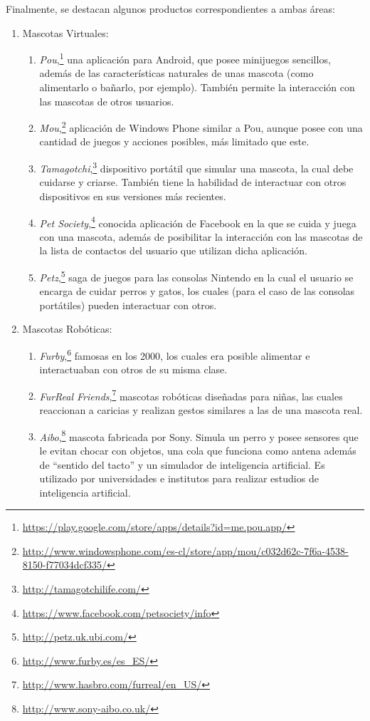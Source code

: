 Finalmente, se destacan algunos productos correspondientes a ambas \'areas:
\begin{enumerate}
\item Mascotas Virtuales:
  \begin{enumerate}
  \item \emph{Pou},\footnote{\url{https://play.google.com/store/apps/details?id=me.pou.app/}} una aplicaci\'on para Android, que posee minijuegos sencillos, adem\'as de las caracter\'isticas naturales de unas mascota (como alimentarlo o ba\~narlo, por ejemplo). Tambi\'en permite la interacci\'on con las mascotas de otros usuarios.
  \item \emph{Mou},\footnote{\url{http://www.windowsphone.com/es-cl/store/app/mou/c032d62c-7f6a-4538-8150-f77034dcf335/}} aplicaci\'on de Windows Phone similar a Pou, aunque posee con una cantidad de juegos y acciones posibles, m\'as limitado que este.
  \item \emph{Tamagotchi},\footnote{\url{http://tamagotchilife.com/}} dispositivo port\'atil que simular una mascota, la cual debe cuidarse y criarse. Tambi\'en tiene la habilidad de interactuar con otros dispositivos en sus versiones m\'as recientes.
  \item \emph{Pet Society},\footnote{\url{https://www.facebook.com/petsociety/info}} conocida aplicaci\'on de Facebook en la que se cuida y juega con una mascota, adem\'as de posibilitar la interacci\'on con las mascotas de la lista de contactos del usuario que utilizan dicha aplicaci\'on.
  \item \emph{Petz},\footnote{\url{http://petz.uk.ubi.com/}} saga de juegos para las consolas Nintendo en la cual el usuario se encarga de cuidar perros y gatos, los cuales (para el caso de las consolas port\'atiles) pueden interactuar con otros.
  \end{enumerate}
\item Mascotas Rob\'oticas:
  \begin{enumerate}
  \item \emph{Furby},\footnote{\url{http://www.furby.es/es_ES/}} famosas en los 2000, los cuales era posible alimentar e interactuaban con otros de su misma clase.
  \item \emph{FurReal Friends},\footnote{\url{http://www.hasbro.com/furreal/en_US/}} mascotas rob\'oticas dise\~nadas para ni\~nas, las cuales reaccionan a caricias y realizan gestos similares a las de una mascota real.
  \item \emph{Aibo},\footnote{\url{http://www.sony-aibo.co.uk/}} mascota fabricada por Sony. Simula un perro y posee sensores que le evitan chocar con objetos, una cola que funciona como antena adem\'as de “sentido del tacto” y un simulador de inteligencia artificial. Es utilizado por universidades e institutos para realizar estudios de inteligencia artificial.
  \end{enumerate}
\end{enumerate}



